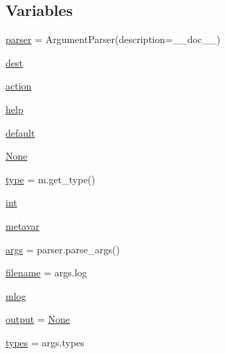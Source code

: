 \subsection*{Variables}
\begin{DoxyCompactItemize}
\item 
\mbox{\hyperlink{namespacepymavlink_1_1tools_1_1mavlogdump_a5944af650a62ea2df82b07337e46c14a}{parser}} = Argument\+Parser(description=\+\_\+\+\_\+doc\+\_\+\+\_\+)
\item 
\mbox{\hyperlink{namespacepymavlink_1_1tools_1_1mavlogdump_a9da9d09d43b823d7f0dbda7c0cd53b06}{dest}}
\item 
\mbox{\hyperlink{namespacepymavlink_1_1tools_1_1mavlogdump_a0d6aaf7db0ab044f6fccc41aef82b384}{action}}
\item 
\mbox{\hyperlink{namespacepymavlink_1_1tools_1_1mavlogdump_a4059ef7894b5364373bb603635bda68c}{help}}
\item 
\mbox{\hyperlink{namespacepymavlink_1_1tools_1_1mavlogdump_a6759c30206138cc486b4e4518b422f83}{default}}
\item 
\mbox{\hyperlink{namespacepymavlink_1_1tools_1_1mavlogdump_a4f907ac5c5d06d13d8020f0969229a7e}{None}}
\item 
\mbox{\hyperlink{namespacepymavlink_1_1tools_1_1mavlogdump_addcfd2a4909e9a13151d343dd1988994}{type}} = m.\+get\+\_\+type()
\item 
\mbox{\hyperlink{namespacepymavlink_1_1tools_1_1mavlogdump_a2fe404e5ba17834d53138cfe0a4fd638}{int}}
\item 
\mbox{\hyperlink{namespacepymavlink_1_1tools_1_1mavlogdump_ad27718929cd610a9c09431db2ee5a519}{metavar}}
\item 
\mbox{\hyperlink{namespacepymavlink_1_1tools_1_1mavlogdump_a82cc95658402c05811fc36d24293de5f}{args}} = parser.\+parse\+\_\+args()
\item 
\mbox{\hyperlink{namespacepymavlink_1_1tools_1_1mavlogdump_a1a3af4daa72962166a120b07458a1d2d}{filename}} = args.\+log
\item 
\mbox{\hyperlink{namespacepymavlink_1_1tools_1_1mavlogdump_a6cff93efb07e41fc83d0590b1c6d2da7}{mlog}}
\item 
\mbox{\hyperlink{namespacepymavlink_1_1tools_1_1mavlogdump_ac1b6c1536c0aa1b9e72138b338e2875d}{output}} = \mbox{\hyperlink{namespacepymavlink_1_1tools_1_1mavlogdump_a4f907ac5c5d06d13d8020f0969229a7e}{None}}
\item 
\mbox{\hyperlink{namespacepymavlink_1_1tools_1_1mavlogdump_a4adf6ef58d78f7724af78687dbb88a27}{types}} = args.\+types
\item 

\end{DoxyCompactItemize}
